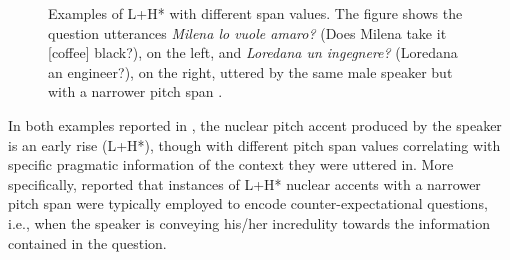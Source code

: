 \documentclass[output=paper,colorlinks,citecolor=brown]{langscibook}
\begin{document}
\begin{figure}
  \caption{Examples of L+H* with different span values. The figure shows the question utterances \textit{Milena lo vuole amaro?} (Does Milena take it [coffee] black?), on the left, and \textit{Loredana un ingegnere?} (Loredana an engineer?), on the right, uttered by the same male speaker but with a narrower pitch span \citep[adapted from][]{orrico19}.}
  \label{fig3}
\end{figure}

In both examples reported in , the nuclear pitch accent produced by the speaker is an early rise (L+H*), though with different pitch span values correlating with specific pragmatic information of the context they were uttered in. More specifically, \citet{orrico19} reported that instances of L+H* nuclear accents with a narrower pitch span were typically employed to encode counter-expectational questions, i.e., when the speaker is conveying his/her incredulity towards the information contained in the question.
\end{document}
